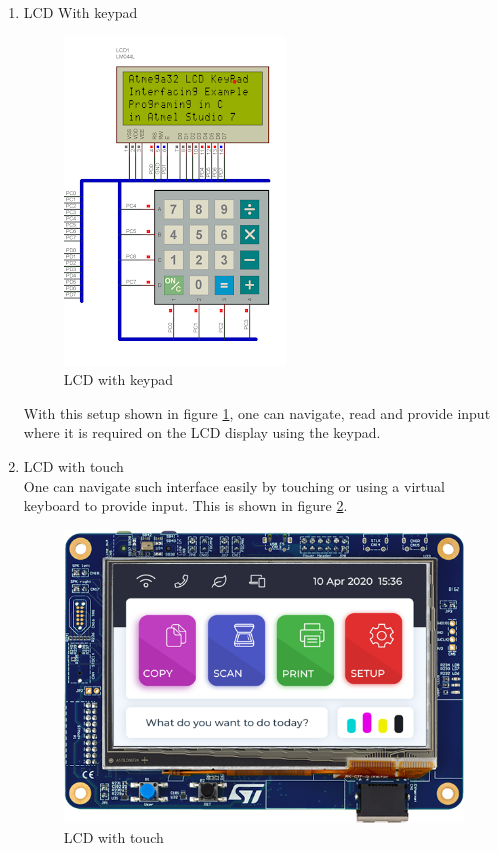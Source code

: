 \begin{enumerate}
    \item LCD With keypad \\
    \begin{figure}
        \centering
        \includegraphics{Figures/controlInterface.png}
        \caption{LCD with keypad \cite{lcd_with_keypad}}
        \label{fig:lcd_with keypad}
    \end{figure}
    With this setup shown in figure \ref{fig:lcd_with keypad}, one can navigate, read and provide input where it is required on the LCD display using the keypad.
    \item LCD with touch \\
    One can navigate such interface easily by touching or using a virtual keyboard to provide input. This is shown in figure \ref{fig:lcd_with_touch}.
    \begin{figure}[!ht]
        \centering
        \includegraphics[width=0.6\linewidth]{Figures/lcdWithTouch.png}
        \caption{LCD with touch  \cite{lcd_with_touch}}
        \label{fig:lcd_with_touch}
    \end{figure}
    \\

\end{enumerate}
